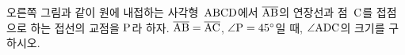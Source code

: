 \noindent\begin{minipage}[t]{0.58\linewidth}\vspace{0pt}\raggedright 오른쪽 그림과 같이 원에 내접하는 사각형~$\mathrm{ABCD}$에서 $\overline{\mathrm{AB}}$의 연장선과 점~$\mathrm{C}$를 접점으로 하는 접선의 교점을 $\mathrm{P}$라 하자. $\overline{\mathrm{AB}}=\overline{\mathrm{AC}}$, $\angle\mathrm{P}=45^\circ$일 때, $\angle\mathrm{ADC}$의 크기를 구하시오.\end{minipage}\hfill\begin{minipage}[t]{0.4\linewidth}\vspace{0pt}\centering \resizebox{\ifdim\width>\linewidth\linewidth\else\width\fi}{!}{}\end{minipage}\par
